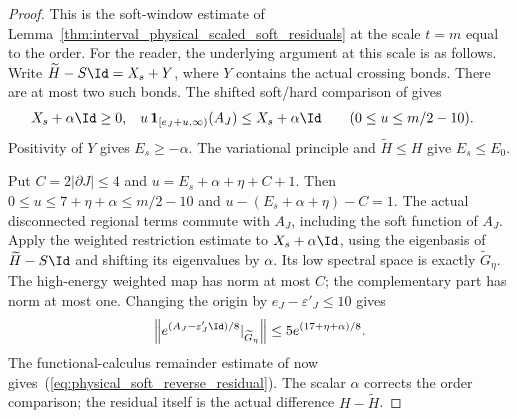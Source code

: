 \begin{proof}\leanok
    This is the soft-window estimate of
    Lemma~\ref{thm:interval_physical_scaled_soft_residuals} at the
    scale $t=m$ equal to the order. For the reader, the underlying argument
    at this scale is as follows. Write $\widetilde H-S\Id=X_s+Y$, where $Y$ contains the actual
    crossing bonds. There are at most two such bonds. The shifted soft/hard
    comparison of \cite{QICLean2026Blueprint} gives
    \begin{align*}
        X_s+\alpha\Id                     & \ge0,             &
        u\,\mathbf1_{[e_J+u,\infty)}(A_J) & \le X_s+\alpha\Id
        \qquad(0\le u\le m/2-10).
    \end{align*}
    Positivity of $Y$ gives $E_s\ge-\alpha$. The variational principle
    and $\widetilde H\le H$ give $E_s\le E_0$.

    Put $C=2|\partial J|\le4$ and
    $u=E_s+\alpha+\eta+C+1$. Then
    $0\le u\le7+\eta+\alpha\le m/2-10$ and
    $u-(E_s+\alpha+\eta)-C=1$. The actual disconnected regional terms
    commute with $A_J$, including the soft function of $A_J$. Apply the
    weighted restriction estimate to $X_s+\alpha\Id$, using the eigenbasis
    of $\widetilde H-S\Id$ and shifting its eigenvalues by $\alpha$.
    Its low spectral space is exactly $\widetilde G_\eta$.
    The high-energy weighted map has norm at most $C$; the complementary
    part has norm at most one. Changing the origin by
    $e_J-\varepsilon'_J\le10$ gives
    \begin{align*}
        \left\|e^{(A_J-\varepsilon'_J\Id)/8}|_{\widetilde G_\eta}\right\|
        \le5e^{(17+\eta+\alpha)/8}.
    \end{align*}
    The functional-calculus remainder estimate of \cite{QICLean2026Blueprint}
    now gives~(\ref{eq:physical_soft_reverse_residual}). The scalar
    $\alpha$ corrects the order comparison; the residual itself is the
    actual difference $H-\widetilde H$.
\end{proof}

